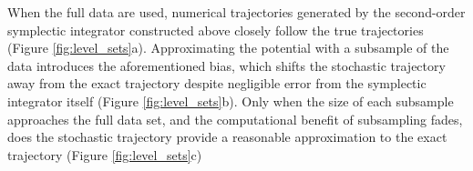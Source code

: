 \documentclass{article}
\begin{document}
When the full data are used, numerical trajectories generated by the second-order 
symplectic integrator constructed above closely follow the true trajectories 
(Figure \ref{fig:level_sets}a).  Approximating the potential with a subsample of the data 
introduces the aforementioned bias, which shifts the stochastic trajectory away from the 
exact trajectory despite negligible error from the symplectic integrator itself (Figure \ref{fig:level_sets}b).
Only when the size of each subsample approaches the full data set, and the computational
benefit of subsampling fades, does the stochastic trajectory provide a reasonable
approximation to the exact trajectory (Figure \ref{fig:level_sets}c)

\begin{figure}
\centering
{}

\end{figure}
\end{document}
